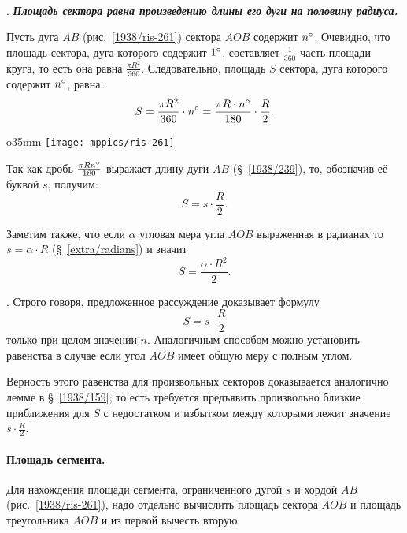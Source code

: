 \paragraph{}\label{1938/268}
\mbox{.}
\textbf{\emph{Площадь сектора равна произведению длины его дуги на половину радиуса.}}

Пусть дуга $AB$ (рис.~\ref{1938/ris-261}) сектора $AOB$ содержит $n\degree$.
Очевидно, что площадь сектора, дуга которого содержит $1\degree$, составляет $\tfrac1{360}$ часть площади круга, то есть она равна $\frac{\pi R^2}{360}$.
Следовательно, площадь $S$ сектора, дуга которого содержит $n\degree$, равна:
\[S=\frac{\pi R^2}{360}\cdot n\degree=\frac{\pi R\cdot  n\degree}{180}\cdot \frac R2.\]

{

\begin{wrapfigure}{o}{35mm}
\vskip-4mm
\centering
\texttt{[image: mppics/ris-261]}
\caption{}\label{1938/ris-261}
\end{wrapfigure}

\noindent
Так как дробь $\frac{\pi R n\degree}{180}$ выражает длину дуги $AB$ (§~\ref{1938/239}), то, обозначив
её буквой $s$, получим:
\[S=s\cdot \frac R2.\]

Заметим также, что если $\alpha$ угловая мера угла $AOB$ выраженная в радианах то $s=\alpha\cdot R$ (§~\ref{extra/radians}) и значит 
\[S=\frac{\alpha\cdot R^2}2.\]

}

{\small
\medskip
\mbox{.}
Строго говоря, предложенное рассуждение доказывает формулу
\[S=s\cdot \frac R2\]
только при целом значении $n$.
Аналогичным способом можно установить равенства в случае если угол $AOB$ имеет общую меру с полным углом.

Верность этого равенства для произвольных секторов доказывается аналогично лемме в §~\ref{1938/159};
то есть требуется предъявить произвольно близкие приближения для $S$ с недостатком и избытком между которыми лежит значение $s\cdot \frac R2$.


}

{\sloppy

\paragraph{Площадь сегмента.}\label{1938/269}
Для нахождения площади сегмента, ограниченного дугой $s$ и хордой $AB$ (рис.~\ref{1938/ris-261}), надо отдельно вычислить площадь сектора $AOB$ и площадь треугольника $AOB$ и из первой вычесть вторую.

}

